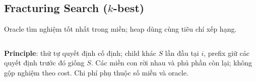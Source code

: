 \subsection{Fracturing Search ($k$-best)}
Oracle tìm nghiệm tốt nhất trong miền; heap dùng cùng tiêu chí xếp hạng.
\inputminted[]{}{source/pseudocode/fracturing_search.txt}
\noindent\textbf{Principle}: thứ tự quyết định cố định; child khác $S$ lần đầu tại $i$, prefix giữ các quyết định trước đó giống $S$. Các miền con rời nhau và phủ phần còn lại; không gộp nghiệm theo cost. Chi phí phụ thuộc số miền và oracle.
